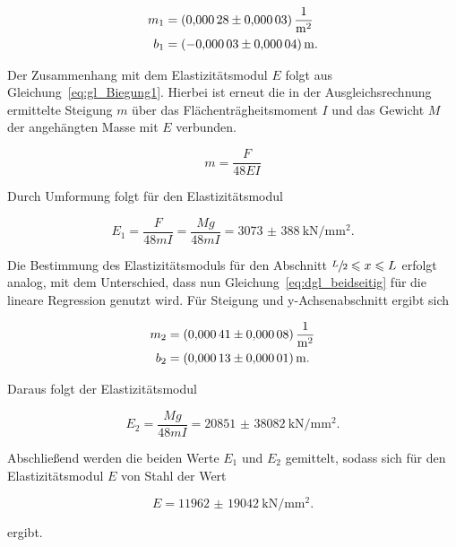 \documentclass[
  bibliography=totoc,     %
  captions=tableheading,  %
  titlepage=firstiscover, %
]{scrartcl}
\begin{document}
\begin{align}
    m_1 &= \SI{0.00028(3)}{\frac{1}{\metre\squared}} \\
    b_1 &= \SI{-0.00003(4)}{\metre}.
\end{align}


Der Zusammenhang mit dem Elastizitätsmodul $E$ folgt aus Gleichung~\eqref{eq:gl_Biegung1}. Hierbei ist
erneut die in der Ausgleichsrechnung ermittelte Steigung $m$ über das Flächenträgheitsmoment $I$ und das
Gewicht $M$ der angehängten Masse mit $E$ verbunden.

\begin{equation}
    m = \frac{F}{48EI}
\end{equation}

Durch Umformung folgt für den Elastizitätsmodul

\begin{equation}
    E_1 = \frac{F}{48mI} = \frac{Mg}{48mI} = \SI{3073(388)}{\kilo\newton\per\milli\metre\squared}.
\end{equation}

Die Bestimmung des Elastizitätsmoduls für den Abschnitt $\sfrac{L}{2}\leqslant x\leqslant L$ erfolgt
analog, mit dem Unterschied, dass nun Gleichung~\eqref{eq:dgl_beidseitig} für die lineare Regression
genutzt wird. Für Steigung und y-Achsenabschnitt ergibt sich

\begin{align}
    m_2 &= \SI{0.00041(8)}{\frac{1}{\metre\squared}} \\
    b_2 &= \SI{0.00013(1)}{\metre}.
\end{align}

Daraus folgt der Elastizitätsmodul

\begin{equation}
    E_2 = \frac{Mg}{48mI} = \SI{20851(38082)}{\kilo\newton\per\milli\metre\squared}.
\end{equation}

Abschließend werden die beiden Werte $E_1$ und $E_2$ gemittelt, sodass sich für den Elastizitätsmodul $E$
von Stahl der Wert

\begin{equation}
    E = \SI{11962(19042)}{\kilo\newton\per\milli\metre\squared}.
\end{equation}

ergibt.
\newpage
\end{document}
